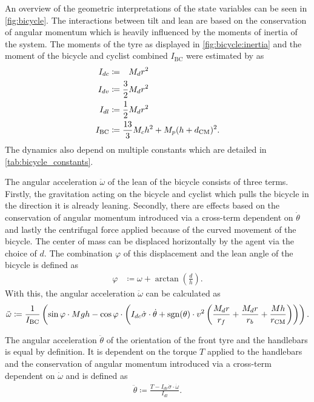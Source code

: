 An overview of the geometric interpretations of the state variables can be seen in \cref{fig:bicycle}.
The interactions between tilt and lean are based on the conservation of angular momentum which is heavily influenced by the moments of inertia of the system.
The moments of the tyre as displayed in \cref{fig:bicycle:inertia} and the moment of the bicycle and cyclist combined $I_{\text{BC}}$ were estimated by \cite{randlov_learning_1998} as
\begin{align}
    I_{dc} &\coloneqq \hphantom{\frac{1}{2}}M_d r^2\\
    I_{dv} &\coloneqq \frac{3}{2}M_d r^2\\
    I_{dl} &\coloneqq \frac{1}{2}M_d r^2\\
    I_{\text{BC}} &\coloneqq \frac{13}{3} M_c h^2 + M_p(h + d_\CM)^2.
\end{align}
The dynamics also depend on multiple constants which are detailed in \cref{tab:bicycle_constants}.

The angular acceleration $\ddot{\omega}$ of the lean of the bicycle consists of three terms.
Firstly, the gravitation acting on the bicycle and cyclist which pulls the bicycle in the direction it is already leaning.
Secondly, there are effects based on the conservation of angular momentum introduced via a cross-term dependent on  $\dot{\theta}$ and lastly the centrifugal force applied because of the curved movement of the bicycle.
The center of mass can be displaced horizontally by the agent via the choice of $d$.
The combination $\varphi$ of this displacement and the lean angle of the bicycle is defined as
\begin{align}
    \varphi &\coloneqq \omega + \arctan \left( \frac{d}{h} \right).
\end{align}
With this, the angular acceleration $\ddot{\omega}$ can be calculated as
\begin{align}
    \ddot{\omega} \coloneqq \frac{1}{I_{\text{BC}}} \left(
        \sin \varphi \cdot Mgh - \cos \varphi \cdot \left(
            I_{dc}\dot{\sigma}\cdot\dot{\theta} +
            \operatorname{sgn}(\theta) \cdot v^2 \left(
                \frac{M_dr}{r_f} + \frac{M_d r}{r_b} + \frac{Mh}{r_{\text{CM}}}
            \right)
        \right)
    \right).
\end{align}

The angular acceleration $\ddot{\theta}$ of the orientation of the front tyre and the handlebars is equal by definition.
It is dependent on the torque $T$ applied to the handlebars and the conservation of angular momentum introduced via a cross-term dependent on $\dot{\omega}$ and is defined as
\begin{align}
    \ddot{\theta} \coloneqq \frac{T - I_{dv}\dot{\sigma}\cdot\dot{\omega}}{I_{dl}}.
\end{align}
